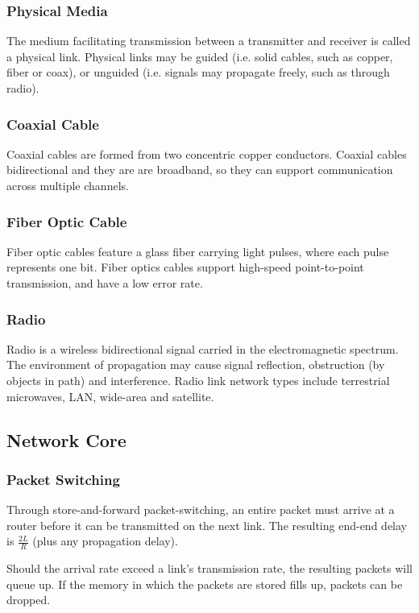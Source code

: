 \documentclass[12pt,titlepage]{article}
\begin{document}
      \subsubsection{Physical Media}
        The medium facilitating transmission between a transmitter and receiver is called a physical link. Physical links may be guided
        (i.e. solid cables, such as copper, fiber or coax), or unguided (i.e. signals may propagate freely, such as through radio).

      \subsubsection{Coaxial Cable}
        Coaxial cables are formed from two concentric copper conductors. Coaxial cables bidirectional and they are are broadband, so they
        can support communication across multiple channels.

      \subsubsection{Fiber Optic Cable}
        Fiber optic cables feature a glass fiber carrying light pulses, where each pulse represents one bit. Fiber optics cables support
        high-speed point-to-point transmission, and have a low error rate.

      \subsubsection{Radio}
        Radio is a wireless bidirectional signal carried in the electromagnetic spectrum. The environment of propagation may cause signal
        reflection, obstruction (by objects in path) and interference. Radio link network types include terrestrial microwaves, LAN, wide-area
        and satellite.

    \subsection{Network Core}
      \subsubsection{Packet Switching}
        Through store-and-forward packet-switching, an entire packet must arrive at a router before it can be transmitted on the next link. The
        resulting end-end delay is $\frac{2L}{R}$ (plus any propagation delay).

        Should the arrival rate exceed a link's transmission rate, the resulting packets will queue up. If the memory in which the packets are
        stored fills up, packets can be dropped.
\end{document}
